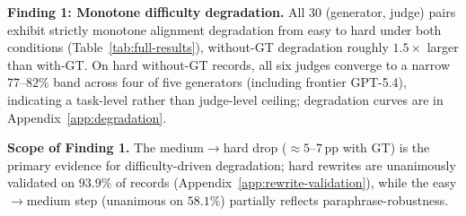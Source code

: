 \textbf{Finding 1: Monotone difficulty degradation.} All 30 (generator, judge) pairs exhibit strictly monotone alignment degradation from easy to hard under both conditions (Table~\ref{tab:full-results}), without-GT degradation roughly $1.5\times$ larger than with-GT. On hard without-GT records, all six judges converge to a narrow $77$--$82\%$ band across four of five generators (including frontier GPT-5.4), indicating a task-level rather than judge-level ceiling; degradation curves are in Appendix~\ref{app:degradation}.
\begin{table}[h]
\centering
\small
\setlength{\tabcolsep}{3pt}
\renewcommand{\arraystretch}{1.02}

\vspace{-0.1cm}
\caption{Full C3 results on Llama-3.3-70B generator. All values are mean alignment (\%) over 3,764--3,771 records per cell.
\textbf{cGT}: corrupted-GT condition. \textbf{Gemini}: Gemini 2.5 Pro.
\textbf{$\Delta_{\text{cGT-GT}}$}: corrupted-GT minus standard GT.
\textbf{$\Delta_{\text{cGT-noGT}}$}: corrupted-GT minus without GT.}
\vspace{-0.2cm}
\label{tab:c3-anchoring}

\end{table}
\textbf{Scope of Finding 1.} The medium$\to$hard drop (${\approx}5$--$7$\,pp with GT) is the primary evidence for difficulty-driven degradation; hard rewrites are unanimously validated on $93.9\%$ of records (Appendix~\ref{app:rewrite-validation}), while the easy$\to$medium step (unanimous on $58.1\%$) partially reflects paraphrase-robustness.

